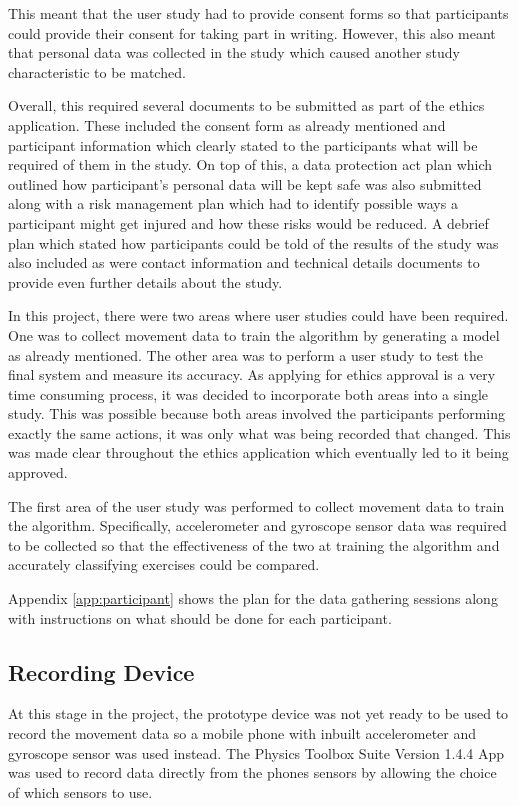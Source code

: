 This meant that the user study had to provide consent forms so that participants could provide their consent for taking part in writing. However, this also meant that personal data was collected in the study which caused another study characteristic to be matched.

Overall, this required several documents to be submitted as part of the ethics application. These included the consent form as already mentioned and participant information which clearly stated to the participants what will be required of them in the study. On top of this, a data protection act plan which outlined how participant's personal data will be kept safe was also submitted along with a risk management plan which had to identify possible ways a participant might get injured and how these risks would be reduced. A debrief plan which stated how participants could be told of the results of the study was also included as were contact information and technical details documents to provide even further details about the study.

In this project, there were two areas where user studies could have been required. One was to collect movement data to train the algorithm by generating a model as already mentioned. The other area was to perform a user study to test the final system and measure its accuracy. As applying for ethics approval is a very time consuming process, it was decided to incorporate both areas into a single study. This was possible because both areas involved the participants performing exactly the same actions, it was only what was being recorded that changed. This was made clear throughout the ethics application which eventually led to it being approved.

The first area of the user study was performed to collect movement data to train the algorithm. Specifically, accelerometer and gyroscope sensor data was required to be collected so that the effectiveness of the two at training the algorithm and accurately classifying exercises could be compared.

Appendix \ref{app:participant} shows the plan for the data gathering sessions along with instructions on what should be done for each participant.

\subsection{Recording Device}
At this stage in the project, the prototype device was not yet ready to be used to record the movement data so a mobile phone with inbuilt accelerometer and gyroscope sensor was used instead. The Physics Toolbox Suite Version 1.4.4 App \cite{vieyra2016} was used to record data directly from the phones sensors by allowing the choice of which sensors to use.


